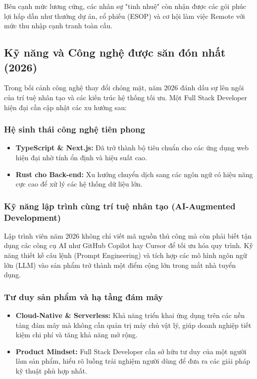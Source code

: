\documentclass[12pt,a4paper]{article}
\begin{document}
Bên cạnh mức lương cứng, các nhân sự "tinh nhuệ" còn nhận được các gói phúc lợi hấp dẫn như thưởng dự án, cổ phiếu (ESOP) và cơ hội làm việc Remote với mức thu nhập cạnh tranh toàn cầu.

\subsection{Kỹ năng và Công nghệ được săn đón nhất (2026)}

\hspace{0.7cm}Trong bối cảnh công nghệ thay đổi chóng mặt, năm 2026 đánh dấu sự lên ngôi của trí tuệ nhân tạo và các kiến trúc hệ thống tối ưu. Một Full Stack Developer hiện đại cần cập nhật các xu hướng sau:
\subsubsection{Hệ sinh thái công nghệ tiên phong}
\begin{itemize}
    \item \textbf{TypeScript \& Next.js:} Đã trở thành bộ tiêu chuẩn cho các ứng dụng web hiện đại nhờ tính ổn định và hiệu suất cao.
    \item \textbf{Rust cho Back-end:} Xu hướng chuyển dịch sang các ngôn ngữ có hiệu năng cực cao để xử lý các hệ thống dữ liệu lớn.
\end{itemize}
\subsubsection{Kỹ năng lập trình cùng trí tuệ nhân tạo (AI-Augmented Development)}
Lập trình viên năm 2026 không chỉ viết mã nguồn thủ công mà còn phải biết tận dụng các công cụ AI như GitHub Copilot hay Cursor để tối ưu hóa quy trình. Kỹ năng thiết kế câu lệnh (Prompt Engineering) và tích hợp các mô hình ngôn ngữ lớn (LLM) vào sản phẩm trở thành một điểm cộng lớn trong mắt nhà tuyển dụng.
\subsubsection{Tư duy sản phẩm và hạ tầng đám mây}
\begin{itemize}
    \item \textbf{Cloud-Native \& Serverless:} Khả năng triển khai ứng dụng trên các nền tảng đám mây mà không cần quản trị máy chủ vật lý, giúp doanh nghiệp tiết kiệm chi phí và tăng khả năng mở rộng.
    \item \textbf{Product Mindset:} Full Stack Developer cần sở hữu tư duy của một người làm sản phẩm, hiểu rõ luồng trải nghiệm người dùng để đưa ra các giải pháp kỹ thuật phù hợp nhất.
\end{itemize}
\end{document}
